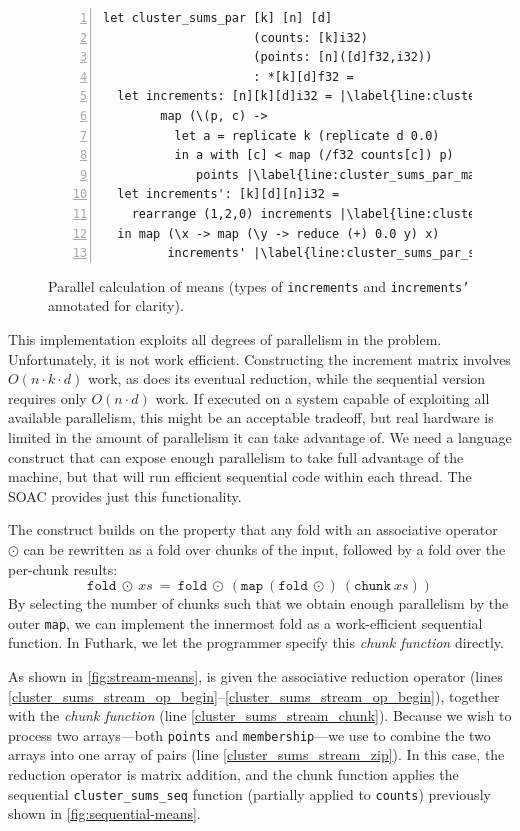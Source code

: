 \begin{figure}
\begin{lstlisting}[numbers=left,escapechar=|]
let cluster_sums_par [k] [n] [d]
                     (counts: [k]i32)
                     (points: [n]([d]f32,i32))
                     : *[k][d]f32 =
  let increments: [n][k][d]i32 = |\label{line:cluster_sums_par_map_begin}|
        map (\(p, c) ->
          let a = replicate k (replicate d 0.0)
          in a with [c] < map (/f32 counts[c]) p)
             points |\label{line:cluster_sums_par_map_end}|
  let increments': [k][d][n]i32 =
    rearrange (1,2,0) increments |\label{line:cluster_sums_par_sum_begin}|
  in map (\x -> map (\y -> reduce (+) 0.0 y) x)
         increments' |\label{line:cluster_sums_par_sum_end}|
\end{lstlisting}
  \caption{Parallel calculation of means (types of \texttt{increments}
    and \texttt{increments'} annotated for clarity).}
\label{fig:parallel-means}
\end{figure}

This implementation exploits all degrees of parallelism in the
problem.  Unfortunately, it is not work efficient.  Constructing the
increment matrix involves
$O(n\cdot{}k\cdot{}d)$ work, as does its eventual reduction, while the
sequential version requires only
$O(n\cdot{}d)$ work.  If executed on a system capable of exploiting
all available parallelism, this might be an acceptable tradeoff, but
real hardware is limited in the amount of parallelism it can take
advantage of.  We need a language construct that can expose enough
parallelism to take full advantage of the machine, but that will run
efficient sequential code within each thread.  The \StreamRed{} SOAC
provides just this functionality.

The \StreamRed{} construct builds on the property that any fold
with an associative operator $\odot$ can be rewritten as a fold over
chunks of the input, followed by a fold over the per-chunk results:
\[
   \texttt{fold}\ \odot\ xs\ =\ \texttt{fold}\ \odot\ (\texttt{map}\ (\texttt{fold}\ \odot)\ (\texttt{chunk}\ xs))
\]
By selecting the number of chunks such that we obtain enough
parallelism by the outer \texttt{map}, we can implement the innermost
fold as a work-efficient sequential function.  In Futhark, we let the
programmer specify this \textit{chunk function} directly.

As shown in \cref{fig:stream-means}, \StreamRed{} is given the
associative reduction operator (lines
\ref{cluster_sums_stream_op_begin}--\ref{cluster_sums_stream_op_begin}),
together with the \textit{chunk function} (line
\ref{cluster_sums_stream_chunk}).  Because we wish to process two
arrays---both \texttt{points} and \texttt{membership}---we use
 to combine the two arrays into one array of pairs (line
\ref{cluster_sums_stream_zip}).  In this case, the reduction operator
is matrix addition, and the chunk function applies the sequential
\lstinline{cluster_sums_seq} function (partially applied to
\lstinline{counts}) previously shown in \cref{fig:sequential-means}.


